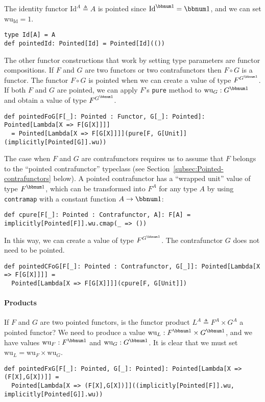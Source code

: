 The identity functor $\text{Id}^{A}\triangleq A$ is pointed since
$\text{Id}^{\bbnum 1}=\bbnum 1$, and we can set $\text{wu}_{\text{Id}}=1$.
\begin{lstlisting}
type Id[A] = A
def pointedId: Pointed[Id] = Pointed[Id](())
\end{lstlisting}

The other functor constructions that work by setting type parameters
are functor compositions. If $F$ and $G$ are two functors or two
contrafunctors then $F\circ G$ is a functor. The functor $F\circ G$
is pointed when we can create a value of type $F^{G^{\bbnum 1}}$.
If both $F$ and $G$ are pointed, we can apply $F$\textsf{'}s \lstinline!pure!
method to $\text{wu}_{G}:G^{\bbnum 1}$ and obtain a value of type
$F^{G^{\bbnum 1}}$.
\begin{lstlisting}
def pointedFoG[F[_]: Pointed : Functor, G[_]: Pointed]: Pointed[Lambda[X => F[G[X]]]]
  = Pointed[Lambda[X => F[G[X]]]](pure[F, G[Unit]](implicitly[Pointed[G]].wu))     
\end{lstlisting}
The case when $F$ and $G$ are contrafunctors requires us to assume
that $F$ belongs to the \textsf{``}pointed contrafunctor\textsf{''} typeclass (see
Section~\ref{subsec:Pointed-contrafunctors} below). A pointed contrafunctor
has a \textsf{``}wrapped unit\textsf{''} value of type $F^{\bbnum 1}$, which can
be transformed into $F^{A}$ for any type $A$ by using \lstinline!contramap!
with a constant function $A\rightarrow\bbnum 1$:
\begin{lstlisting}
def cpure[F[_]: Pointed : Contrafunctor, A]: F[A] = implicitly[Pointed[F]].wu.cmap(_ => ())
\end{lstlisting}
In this way, we can create a value of type $F^{G^{\bbnum 1}}$. The
contrafunctor $G$ does not need to be pointed.
\begin{lstlisting}
def pointedCFoG[F[_]: Pointed : Contrafunctor, G[_]]: Pointed[Lambda[X => F[G[X]]]] =
  Pointed[Lambda[X => F[G[X]]]](cpure[F, G[Unit]])
\end{lstlisting}


\paragraph{Products}

If $F$ and $G$ are two pointed functors, is the functor product
$L^{A}\triangleq F^{A}\times G^{A}$ a pointed functor? We need to
produce a value $\text{wu}_{L}:F^{\bbnum 1}\times G^{\bbnum 1}$,
and we have values $\text{wu}_{F}:F^{\bbnum 1}$ and $\text{wu}_{G}:G^{\bbnum 1}$.
It is clear that we must set $\text{wu}_{L}=\text{wu}_{F}\times\text{wu}_{G}$.
\begin{lstlisting}
def pointedFxG[F[_]: Pointed, G[_]: Pointed]: Pointed[Lambda[X => (F[X],G[X])]] =
  Pointed[Lambda[X => (F[X],G[X])]]((implicitly[Pointed[F]].wu, implicitly[Pointed[G]].wu))
\end{lstlisting}


